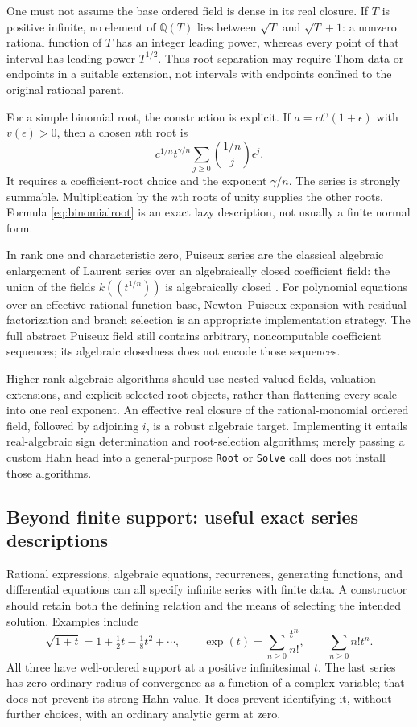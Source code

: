 \documentclass[11pt,letterpaper]{article}
\theoremstyle{definition}\newtheorem{definition}[theorem]{Definition}
\theoremstyle{remark}\newtheorem{remark}[theorem]{Remark}
\newcommand{\Q}{\mathbb Q}\newcommand{\N}{\mathbb N}\newcommand{\Z}{\mathbb Z}
\newcommand{\code}[1]{\texttt{#1}}
\numberwithin{equation}{section}\setcounter{tocdepth}{2}
\begin{document}
One must not assume the base ordered field is dense in its real closure. If $T$ is positive infinite, no element of $\Q(T)$ lies between $\sqrt T$ and $\sqrt T+1$: a nonzero rational function of $T$ has an integer leading power, whereas every point of that interval has leading power $T^{1/2}$. Thus root separation may require Thom data or endpoints in a suitable extension, not intervals with endpoints confined to the original rational parent.

For a simple binomial root, the construction is explicit. If $a=c t^\gamma(1+\epsilon)$ with $v(\epsilon)>0$, then a chosen $n$th root is
\begin{equation}\label{eq:binomialroot}
 c^{1/n}t^{\gamma/n}
 \sum_{j\ge0}\binom{1/n}{j}\epsilon^j.
\end{equation}
It requires a coefficient-root choice and the exponent $\gamma/n$. The series is strongly summable. Multiplication by the $n$th roots of unity supplies the other roots. Formula \eqref{eq:binomialroot} is an exact lazy description, not usually a finite normal form.

In rank one and characteristic zero, Puiseux series are the classical algebraic enlargement of Laurent series over an algebraically closed coefficient field: the union of the fields $k((t^{1/n}))$ is algebraically closed \cite[Corollary 7]{Poonen}. For polynomial equations over an effective rational-function base, Newton--Puiseux expansion with residual factorization and branch selection is an appropriate implementation strategy. The full abstract Puiseux field still contains arbitrary, noncomputable coefficient sequences; its algebraic closedness does not encode those sequences.

Higher-rank algebraic algorithms should use nested valued fields, valuation extensions, and explicit selected-root objects, rather than flattening every scale into one real exponent. An effective real closure of the rational-monomial ordered field, followed by adjoining $i$, is a robust algebraic target. Implementing it entails real-algebraic sign determination and root-selection algorithms; merely passing a custom Hahn head into a general-purpose \code{Root} or \code{Solve} call does not install those algorithms.

\subsection{Beyond finite support: useful exact series descriptions}
Rational expressions, algebraic equations, recurrences, generating functions, and differential equations can all specify infinite series with finite data. A constructor should retain both the defining relation and the means of selecting the intended solution. Examples include
\[
 \sqrt{1+t}=1+\tfrac12t-\tfrac18t^2+\cdots,
 \qquad \exp(t)=\sum_{n\ge0}\frac{t^n}{n!},
 \qquad \sum_{n\ge0}n!t^n.
\]
All three have well-ordered support at a positive infinitesimal $t$. The last series has zero ordinary radius of convergence as a function of a complex variable; that does not prevent its strong Hahn value. It does prevent identifying it, without further choices, with an ordinary analytic germ at zero.
\end{document}
